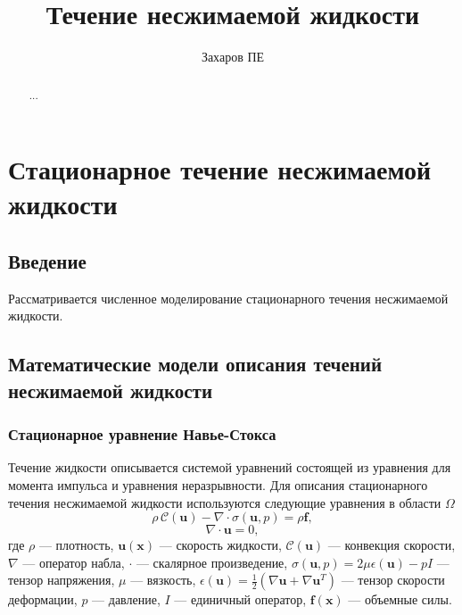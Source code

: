 \documentclass[a4paper,10pt]{report}
\title{Течение несжимаемой жидкости}
\author{Захаров ПЕ}
\begin{document}
\maketitle

\begin{abstract}
...
\end{abstract}



\chapter{Стационарное течение несжимаемой жидкости}

\section*{Введение}
Рассматривается численное моделирование стационарного течения несжимаемой жидкости. 

\section{Математические модели описания течений несжимаемой жидкости}

\subsection{Стационарное уравнение Навье-Стокса}

Течение жидкости описывается системой уравнений состоящей из уравнения для момента импульса и уравнения неразрывности. Для описания стационарного течения несжимаемой жидкости используются следующие уравнения в области $\Omega$
\begin{equation}
  \rho \,\mathcal{C}(\bm{u})
- \nabla \cdot \sigma(\bm{u}, p)
= \rho \bm{f},
\label{eq:navier-stokes}
\end{equation}
\begin{equation}
\nabla \cdot \bm{u} = 0,
\label{eq:incompressibility}
\end{equation}
где $\rho$ --- плотность, $\bm{u}(\bm{x})$ --- скорость жидкости, $\mathcal{C}(\bm{u})$ --- конвекция скорости, $\nabla$ --- оператор набла, $\cdot$ --- скалярное произведение, $\sigma(\bm{u}, p)=2 \mu \epsilon(\bm{u}) - p I$ --- тензор напряжения, $\mu$ --- вязкость, $\epsilon(\bm{u}) = \frac{1}{2}\left(\nabla \bm{u} + \nabla \bm{u}^T \right)$ --- тензор скорости деформации, $p$ --- давление, $I$ --- единичный оператор, $\bm{f}(\bm{x})$ --- объемные силы.
\end{document}
